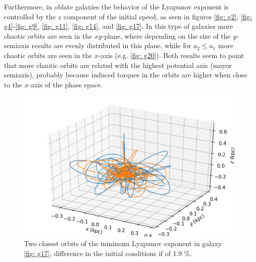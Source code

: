 	Furthermore, in oblate galaxies the behavior of the Lyapunov exponent is controlled by the $z$ component of the initial speed, as seen in figures \ref{fig: g2}, \ref{fig: g4}-\ref{fig: g9}, \ref{fig: g11}, \ref{fig: g14}, and \ref{fig: g17}. In this type of galaxies more chaotic orbits are seen in the $xy$-plane, where depending on the size of the $y$-semiaxis results are evenly distributed in this plane, while for $a_2 \leq a_1$ more chaotic orbits are seen in the $x$-axis (e.g. \autoref{fig: g20}). Both results seem to point that more chaotic orbits are related with the highest potential axis (mayor semiaxis), probably because induced torques in the orbits are higher when close to the $x$-axis of the phase space.
	\begin{figure}[h]
		\centering
		\includegraphics[width = 0.7\linewidth]{"../Files/Week 14/lyapunov_orbits"}
		\caption{Two closest orbits of the minimum Lyapunov exponent in galaxy \ref{fig: g17}, difference in the initial conditions if of 1.9 \%.}
		\label{fig: lyapunov17}
	\end{figure}